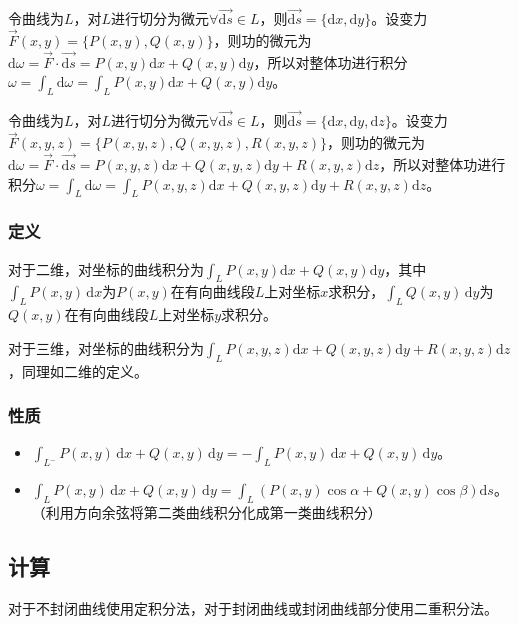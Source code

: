 \documentclass[UTF8, 12pt]{ctexart}
\begin{document}
        令曲线为$L$，对$L$进行切分为微元$\forall\overrightarrow{\textrm{d}s}\in L$，则$\overrightarrow{\textrm{d}s}=\{\textrm{d}x,\textrm{d}y\}$。设变力$\vec{F}(x,y)=\{P(x,y),Q(x,y)\}$，则功的微元为$\textrm{d}\omega=\vec{F}\cdot\overrightarrow{\textrm{d}s}=P(x,y)\textrm{d}x+Q(x,y)\textrm{d}y$，所以对整体功进行积分$\omega=\int_L\textrm{d}\omega=\int_LP(x,y)\textrm{d}x+Q(x,y)\textrm{d}y$。

        令曲线为$L$，对$L$进行切分为微元$\forall\overrightarrow{\textrm{d}s}\in L$，则$\overrightarrow{\textrm{d}s}=\{\textrm{d}x,\textrm{d}y,\textrm{d}z\}$。设变力$\vec{F}(x,y,z)=\{P(x,y,z),Q(x,y,z),R(x,y,z)\}$，则功的微元为$\textrm{d}\omega=\vec{F}\cdot\overrightarrow{\textrm{d}s}=P(x,y,z)\textrm{d}x+Q(x,y,z)\textrm{d}y+R(x,y,z)\textrm{d}z$，所以对整体功进行积分$\omega=\int_L\textrm{d}\omega=\int_LP(x,y,z)\textrm{d}x+Q(x,y,z)\textrm{d}y+R(x,y,z)\textrm{d}z$。

        \subsubsection{定义}

        对于二维，对坐标的曲线积分为$\int_LP(x,y)\textrm{d}x+Q(x,y)\textrm{d}y$，其中$\int_LP(x,y)\,\textrm{d}x$为$P(x,y)$在有向曲线段$L$上对坐标$x$求积分，$\int_LQ(x,y)\,\textrm{d}y$为$Q(x,y)$在有向曲线段$L$上对坐标$y$求积分。

        对于三维，对坐标的曲线积分为$\int_LP(x,y,z)\textrm{d}x+Q(x,y,z)\textrm{d}y+R(x,y,z)\textrm{d}z$，同理如二维的定义。

        \subsubsection{性质}

        \begin{itemize}
            \item $\int_{L^-}P(x,y)\,\textrm{d}x+Q(x,y)\,\textrm{d}y=-\int_LP(x,y)\,\textrm{d}x+Q(x,y)\,\textrm{d}y$。
            \item $\int_LP(x,y)\,\textrm{d}x+Q(x,y)\,\textrm{d}y=\int_L(P(x,y)\cos\alpha+Q(x,y)\cos\beta)\textrm{d}s$。（利用方向余弦将第二类曲线积分化成第一类曲线积分）
        \end{itemize}

        \subsection{计算}

        对于不封闭曲线使用定积分法，对于封闭曲线或封闭曲线部分使用二重积分法。
\end{document}
